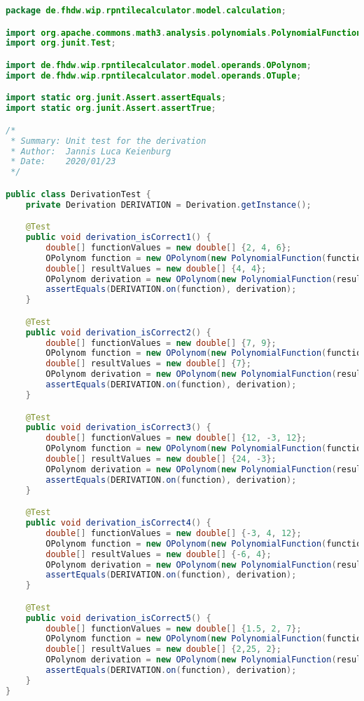 \begin{lstlisting}[caption=DerivationTest (Keienburg),label=list:DerivationTest,language=Java]
package de.fhdw.wip.rpntilecalculator.model.calculation;

import org.apache.commons.math3.analysis.polynomials.PolynomialFunction;
import org.junit.Test;

import de.fhdw.wip.rpntilecalculator.model.operands.OPolynom;
import de.fhdw.wip.rpntilecalculator.model.operands.OTuple;

import static org.junit.Assert.assertEquals;
import static org.junit.Assert.assertTrue;

/*
 * Summary: Unit test for the derivation
 * Author:  Jannis Luca Keienburg
 * Date:    2020/01/23
 */

public class DerivationTest {
    private Derivation DERIVATION = Derivation.getInstance();

    @Test
    public void derivation_isCorrect1() {
        double[] functionValues = new double[] {2, 4, 6};
        OPolynom function = new OPolynom(new PolynomialFunction(functionValues));
        double[] resultValues = new double[] {4, 4};
        OPolynom derivation = new OPolynom(new PolynomialFunction(resultValues));
        assertEquals(DERIVATION.on(function), derivation);
    }

    @Test
    public void derivation_isCorrect2() {
        double[] functionValues = new double[] {7, 9};
        OPolynom function = new OPolynom(new PolynomialFunction(functionValues));
        double[] resultValues = new double[] {7};
        OPolynom derivation = new OPolynom(new PolynomialFunction(resultValues));
        assertEquals(DERIVATION.on(function), derivation);
    }

    @Test
    public void derivation_isCorrect3() {
        double[] functionValues = new double[] {12, -3, 12};
        OPolynom function = new OPolynom(new PolynomialFunction(functionValues));
        double[] resultValues = new double[] {24, -3};
        OPolynom derivation = new OPolynom(new PolynomialFunction(resultValues));
        assertEquals(DERIVATION.on(function), derivation);
    }

    @Test
    public void derivation_isCorrect4() {
        double[] functionValues = new double[] {-3, 4, 12};
        OPolynom function = new OPolynom(new PolynomialFunction(functionValues));
        double[] resultValues = new double[] {-6, 4};
        OPolynom derivation = new OPolynom(new PolynomialFunction(resultValues));
        assertEquals(DERIVATION.on(function), derivation);
    }

    @Test
    public void derivation_isCorrect5() {
        double[] functionValues = new double[] {1.5, 2, 7};
        OPolynom function = new OPolynom(new PolynomialFunction(functionValues));
        double[] resultValues = new double[] {2,25, 2};
        OPolynom derivation = new OPolynom(new PolynomialFunction(resultValues));
        assertEquals(DERIVATION.on(function), derivation);
    }
}
\end{lstlisting} 

